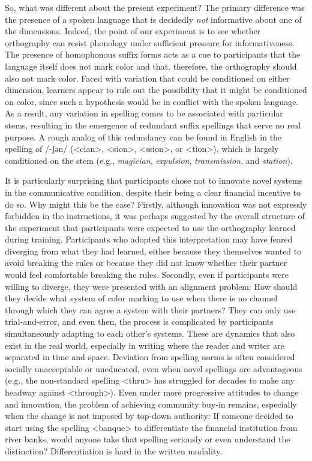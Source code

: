\documentclass[doc,biblatex]{apa7}
\begin{document}
So, what was different about the present experiment? The primary difference was the presence of a spoken language that is decidedly \textit{not} informative about one of the dimensions. Indeed, the point of our experiment is to see whether orthography can resist phonology under sufficient pressure for informativeness. The presence of homophonous suffix forms acts as a cue to participants that the language itself does not mark color and that, therefore, the orthography should also not mark color. Faced with variation that could be conditioned on either dimension, learners appear to rule out the possibility that it might be conditioned on color, since such a hypothesis would be in conflict with the spoken language. As a result, any variation in spelling comes to be associated with particular stems, resulting in the emergence of redundant suffix spellings that serve no real purpose. A rough analog of this redundancy can be found in English in the spelling of /-ʃən/ (<cian>, <sion>, <ssion>, or <tion>), which is largely conditioned on the stem (e.g., \textit{magician}, \textit{expulsion}, \textit{transmission}, and \textit{station}).

It is particularly surprising that participants chose not to innovate novel systems in the communicative condition, despite their being a clear financial incentive to do so. Why might this be the case? Firstly, although innovation was not expressly forbidden in the instructions, it was perhaps suggested by the overall structure of the experiment that participants were expected to use the orthography learned during training. Participants who adopted this interpretation may have feared diverging from what they had learned, either because they themselves wanted to avoid breaking the rules or because they did not know whether their partner would feel comfortable breaking the rules. Secondly, even if participants were willing to diverge, they were presented with an alignment problem: How should they decide what system of color marking to use when there is no channel through which they can agree a system with their partners? They can only use trial-and-error, and even then, the process is complicated by participants simultaneously adapting to each other's systems. These are dynamics that also exist in the real world, especially in writing where the reader and writer are separated in time and space. Deviation from spelling norms is often considered socially unacceptable or uneducated, even when novel spellings are advantageous (e.g., the non-standard spelling <thru> has struggled for decades to make any headway against <through>). Even under more progressive attitudes to change and innovation, the problem of achieving community buy-in remains, especially when the change is not imposed by top-down authority: If someone decided to start using the spelling <banque> to differentiate the financial institution from river banks, would anyone take that spelling seriously or even understand the distinction? Differentiation is hard in the written modality.
\end{document}
